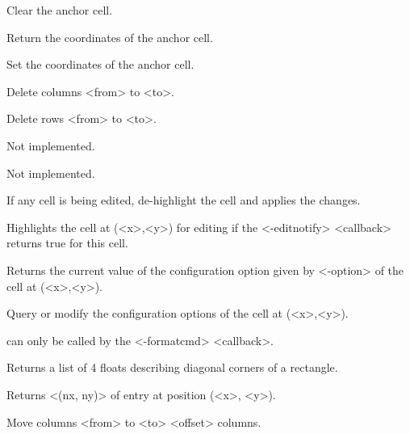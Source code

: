 \vskip5pt

\begin{enum}{1cm}

Clear the anchor cell.

Return the coordinates of the anchor cell.

Set the coordinates of the anchor cell.


Delete columns <from> to <to>.

Delete rows <from> to <to>.

Not implemented.

Not implemented.

If any cell is being edited, de-highlight the cell and
applies the changes.

Highlights the cell at (<x>,<y>) for editing
if the <-editnotify> <callback> returns true for this cell.

Returns the current value of the configuration option given by
<-option> of the cell at (<x>,<y>).

Query or modify the configuration options of the cell at (<x>,<y>).


 can only be called by the <-formatcmd> <callback>.

Returns a list of 4 floats describing diagonal corners of a rectangle.

Returns <(nx, ny)> of entry at position (<x>, <y>).


Move columns <from> to <to> <offset> columns.


\end{enum}
